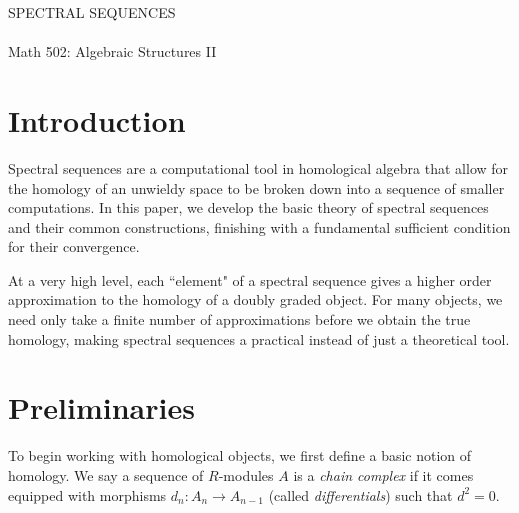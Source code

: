 \documentclass[twoside,10pt]{article}
\begin{document}
\begin{center}
        {\huge \sffamily \MakeUppercase{Spectral Sequences}}\\
	\vspace{3mm}
        {\large \sffamily {}}\\
        \vspace{3mm}
        {Math 502: Algebraic Structures II}
        \vspace{5mm}
\end{center}

\thispagestyle{empty}



\section{Introduction}

Spectral sequences are a computational tool in homological algebra that allow for the homology of an unwieldy space to be broken down into a sequence of smaller computations. In this paper, we develop the basic theory of spectral sequences and their common constructions, finishing with a fundamental sufficient condition for their convergence.

At a very high level, each ``element" of a spectral sequence gives a higher order approximation to the homology of a doubly graded object. For many objects, we need only take a finite number of approximations before we obtain the true homology, making spectral sequences a practical instead of just a theoretical tool.


\section{Preliminaries}

To begin working with homological objects, we first define a basic notion of homology. We say a sequence of $R$-modules $A$ is a \textit{chain complex} if it comes equipped with morphisms $ d_n:A_{n}\to A_{n-1}$ (called \textit{differentials}) such that $d^2 =0$.
\begin{center}
\end{center}
\end{document}

